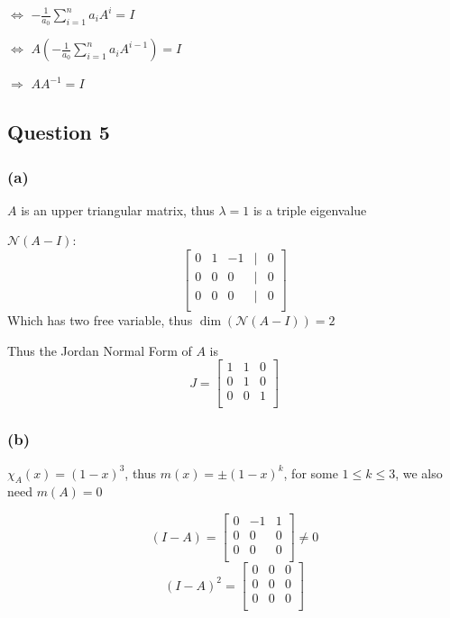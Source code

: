 \documentclass{article}
\begin{document}
\(\iff\) \(-\frac{1}{a_0}\sum_{i=1}^{n} a_i A^i= I\)

\(\iff\) \(A(-\frac{1}{a_0}\sum_{i=1}^{n} a_i A^{i-1}) = I\)

\(\Rightarrow\) \(AA^{-1} = I\)




\subsection*{Question 5}
\subsubsection*{(a)}
\(A\) is an upper triangular matrix, thus \(\lambda = 1\) is a triple eigenvalue

\(\mathcal{N}(A-I):\)
\[
\begin{bmatrix}
    0 & 1 & -1 & | & 0 \\
    0 & 0 & 0 & | & 0 \\
    0 & 0 & 0 & | & 0 \\
\end{bmatrix}
\]
Which has two free variable, thus \(\dim(\mathcal{N}(A-I)) = 2\)

Thus the Jordan Normal Form of \(A\) is 
\[
J = \begin{bmatrix}
    1 & 1 & 0 \\
    0 & 1 & 0  \\
    0 & 0 & 1  \\
\end{bmatrix}
\]

\subsubsection*{(b)}
\(\chi_A(x) = (1 - x)^3\), thus \(m(x) = \pm (1- x)^k\), for some \(1 \leq k \leq 3\), we also need \(m(A) = 0\)

\[
(I - A) = \begin{bmatrix}
    0 & -1 & 1 \\
    0 & 0 & 0  \\
    0 & 0 & 0  \\    
\end{bmatrix} \neq 0
\]
\[
(I - A)^2 = \begin{bmatrix}
    0 & 0 & 0 \\
    0 & 0 & 0  \\
    0 & 0 & 0  \\
\end{bmatrix}
\]
\end{document}
